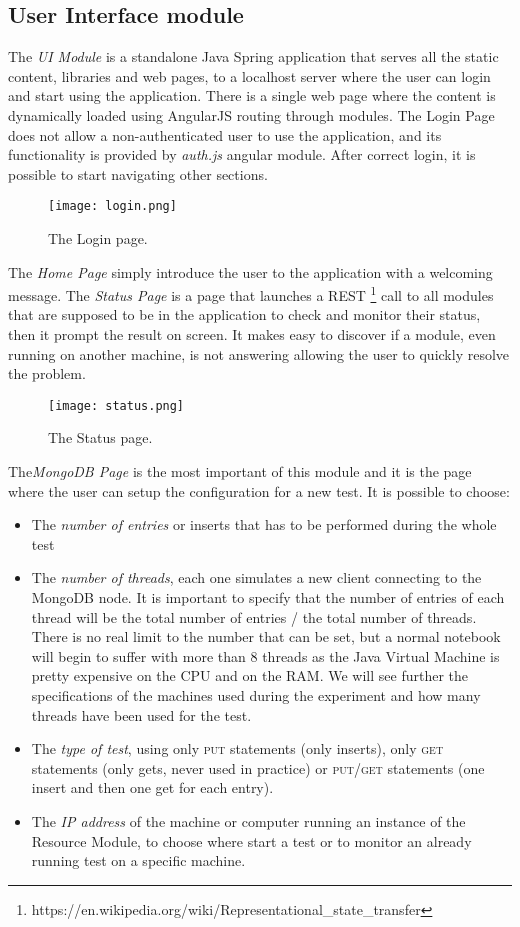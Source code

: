 \subsection{User Interface module}
The \textit{UI Module} is a standalone Java Spring application that serves all the static content, libraries and web pages, to a localhost server where the user can login and start using the application. There is a single web page where the content is dynamically loaded using AngularJS routing through modules.
The Login Page does not allow a non-authenticated user to use the application, and its functionality is provided by \textit{auth.js} angular module. After correct login, it is possible to start navigating other sections.
\begin{figure}[H]
\texttt{[image: login.png]}
\centering
\caption{The Login page.}
\end{figure}
The \textit{Home Page} simply introduce the user to the application with a welcoming message.
The \textit{Status Page} is  a page that launches a REST \footnote{https://en.wikipedia.org/wiki/Representational\_state\_transfer} call to all modules that are supposed to be in the application to check and monitor their status, then it prompt the result on screen. It makes easy to discover if a module, even running on another machine, is not answering allowing the user to quickly resolve the problem.
\begin{figure}[H]
\texttt{[image: status.png]}
\centering
\caption{The Status page.}
\end{figure}
The\textit{MongoDB Page} is the most important of this module and  it is the page where the user can setup the configuration for a new test.
It is possible to choose:
\begin{itemize}
	\item The\textit{ number of entries} or inserts that has to be performed during the whole test
	\item The \textit{number of threads}, each one simulates a new client connecting to the MongoDB node. It is important to specify that the number of entries of each thread will be the total number of entries / the total number of threads. There is no real limit to the number that can be set, but a normal notebook will begin to suffer with more than 8 threads as the Java Virtual Machine is pretty expensive on the CPU and on the RAM. We will see further the specifications of the machines used during the experiment and how many threads have been used for the test.
	\item The \textit{type of test}, using only \textsc{put} statements (only inserts), only \textsc{get} statements (only gets, never used in practice) or \textsc{put/get} statements (one insert and then one get for each entry).
	\item The \textit{IP address} of the machine or computer running an instance of the Resource Module, to choose where start a test or to monitor an already running test on a specific machine.
\end{itemize}
